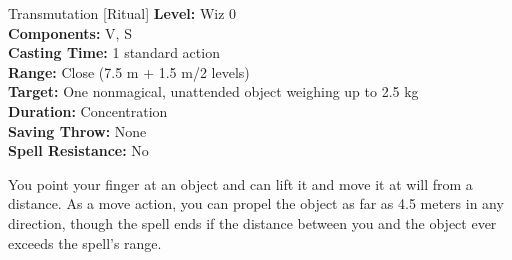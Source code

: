 {Transmutation [Ritual]}
{
	\textbf{Level:}
	Wiz 0\\
	\textbf{Components:}
	V, S\\
	\textbf{Casting Time:}
	1 standard action\\
	\textbf{Range:}
	Close (7.5 m + 1.5 m/2 levels)\\
	\textbf{Target:}
	One nonmagical, unattended object weighing up to 2.5 kg\\
	\textbf{Duration:}
	Concentration\\
	\textbf{Saving Throw:}
	None\\
	\textbf{Spell Resistance:}
	No\\
}
{
	You point your finger at an object and can lift it and move it at will from a distance. As a move action, you can propel the object as far as 4.5 meters in any direction, though the spell ends if the distance between you and the object ever exceeds the spell's range.

}

